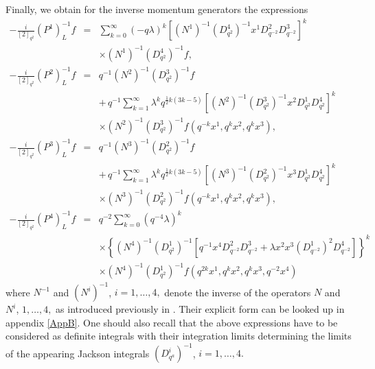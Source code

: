 \documentclass[a4paper,11pt,oneside]{article}
\begin{document}
Finally, we obtain for the inverse momentum generators the expressions 
\begin{eqnarray}
-\frac{i}{\left[ 2\right] _{q^{2}}}\left( P^{1}\right) _{L}^{-1}f
&=&\sum_{k=0}^{\infty }\left( -q\lambda \right) ^{k}\left[ \left(
N^{1}\right) ^{-1}\left( D_{q^{2}}^{4}\right)
^{-1}x^{1}D_{q^{-2}}^{2}D_{q^{-2}}^{3}\right] ^{k} \\
&&\times \left( N^{1}\right) ^{-1}\left( D_{q^{2}}^{4}\right) ^{-1}f, 
\nonumber \\
-\frac{i}{\left[ 2\right] _{q^{2}}}\left( P^{2}\right) _{L}^{-1}f
&=&q^{-1}\left( N^{2}\right) ^{-1}\left( D_{q^{2}}^{3}\right) ^{-1}f 
\nonumber \\
&&+\,q^{-1}\sum_{k=1}^{\infty }\lambda ^{k}q^{\frac{1}{2}k\left( 3k-5\right)
}\left[ \left( N^{2}\right) ^{-1}\left( D_{q^{2}}^{3}\right)
^{-1}x^{2}D_{q^{2}}^{1}D_{q^{2}}^{4}\right] ^{k}  \nonumber \\
&&\times \left( N^{2}\right) ^{-1}\left( D_{q^{2}}^{3}\right) ^{-1}f\left(
q^{-k}x^{1},q^{k}x^{2},q^{k}x^{3}\right) ,  \nonumber \\
-\frac{i}{\left[ 2\right] _{q^{2}}}\left( P^{3}\right) _{L}^{-1}f
&=&q^{-1}\left( N^{3}\right) ^{-1}\left( D_{q^{2}}^{2}\right) ^{-1}f 
\nonumber \\
&&+\,q^{-1}\sum_{k=1}^{\infty }\lambda ^{k}q^{\frac{1}{2}k\left( 3k-5\right)
}\left[ \left( N^{3}\right) ^{-1}\left( D_{q^{2}}^{2}\right)
^{-1}x^{3}D_{q^{2}}^{1}D_{q^{2}}^{4}\right] ^{k}  \nonumber \\
&&\times \left( N^{3}\right) ^{-1}\left( D_{q^{2}}^{2}\right) ^{-1}f\left(
q^{-k}x^{1},q^{k}x^{2},q^{k}x^{3}\right) ,  \nonumber \\
-\frac{i}{\left[ 2\right] _{q^{2}}}\left( P^{4}\right) _{L}^{-1}f
&=&q^{-2}\sum_{k=0}^{\infty }\left( q^{-4}\lambda \right) ^{k}  \nonumber \\
&&\times \left\{ \left( N^{4}\right) ^{-1}\left( D_{q^{2}}^{1}\right)
^{-1}\left[ q^{-1}x^{4}D_{q^{-2}}^{2}D_{q^{-2}}^{3}+\lambda x^{2}x^{3}\left(
D_{q^{-2}}^{1}\right) ^{2}D_{q^{-2}}^{4}\right] \right\} ^{k}  \nonumber \\
&&\times \left( N^{4}\right) ^{-1}\left( D_{q^{2}}^{1}\right) ^{-1}f\left(
q^{2k}x^{1},q^{k}x^{2},q^{k}x^{3},q^{-2}x^{4}\right)   \nonumber
\end{eqnarray}
where $N^{-1}$ and $\left( N^{i}\right) ^{-1}$, $i=1,\ldots ,4,$ denote the
inverse of the operators $N$ and $N^{i}$, $1,\ldots ,4,$ as introduced
previously in \cite{BW01}. Their explicit form can be looked up in appendix
\ref{AppB}. One should also recall that the above expressions have to
be considered
as definite integrals with their integration limits determining the limits
of the appearing Jackson integrals $\left( D_{q^{a}}^{i}\right) ^{-1}$, $%
i=1,\ldots ,4.$
\end{document}
